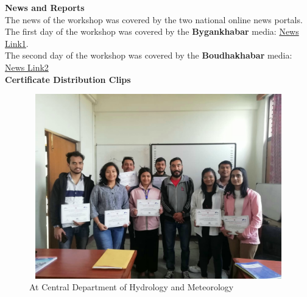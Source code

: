 \documentclass[a4paper,12pt]{report}
\begin{document}
{\bfseries \large News and Reports}\\[3mm]
The news of the workshop was covered by the two national online news portals. The first day of the workshop was covered by the \textbf{Bygankhabar} media: \href{https://bigyankhabar.com/news/466?fbclid=IwZXh0bgNhZW0CMTEAAR2T6N0ZWHThH36HAoFJzrOioSew3a5q9cheBVtr23fTcmynHWW23u9kL7Q_aem_Ab1AITgAqW20AfXdGEopIJzsS-SPnux6ygiMfDMx6DCzY9p1xqf0KG2THdmgxjEKleYf9EwSC_gBVom8hVjHb8Y1}{News Link1}.\\
The second day of the workshop was covered by the \textbf{Boudhakhabar} media:
\href{https://www.boudhakhabar.com/details/5789?fbclid=IwAR3h4kfiercOQEBUr2oSNwfA1fBK4yhx0DEQxMiiGN-5kWbVKvWYWtkgyrw}{News Link2}\\[4mm]

{\bfseries \large Certificate Distribution Clips}\\[3mm]
 \begin{figure}[h!]
  \centering
  \includegraphics[width=12cm, height=8cm]{certificate.jpg}
  \caption{\small At Central Department of Hydrology and Meteorology}
\end{figure}
\clearpage
\end{document}
